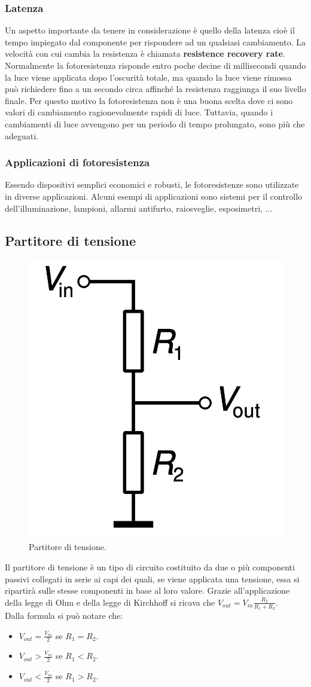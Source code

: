 \documentclass[12pt,oneside,a4paper]{article}
\begin{document}
\subsubsection{Latenza}
Un aspetto importante da tenere in considerazione è quello della latenza cioè il tempo impiegato dal componente per rispondere ad un qualsiasi cambiamento. La velocità con cui cambia la resistenza è chiamata \textbf{resistence recovery rate}.
\\ Normalmente la fotoresistenza risponde entro poche decine di millisecondi quando la luce viene applicata dopo l'oscurità totale, ma quando la luce viene rimossa può richiedere fino a un secondo circa affinché la resistenza raggiunga il suo livello finale. Per questo motivo la fotoresistenza non è una buona scelta dove ci sono valori di cambiamento ragionevolmente rapidi di luce. Tuttavia, quando i cambiamenti di luce avvengono per un periodo di tempo prolungato, sono più che adeguati.


\subsubsection{Applicazioni di fotoresistenza}
Essendo dispositivi semplici economici e robusti, le fotoresistenze sono utilizzate in diverse applicazioni. Alcuni esempi di applicazioni sono sistemi per il controllo dell'illuminazione, lampioni, allarmi antifurto, raiosveglie, esposimetri, ...


\subsection{Partitore di tensione}
\begin{figure}[!htb]
    \centering
    \includegraphics[width=0.3\linewidth]{figures/partitore_tensione.png}
    \caption{Partitore di tensione.}
\end{figure}
Il partitore di tensione\cite{VoltageDivider} è un tipo di circuito costituito da due o più componenti passivi collegati in serie ai capi dei quali, se viene applicata una tensione, essa si ripartirà sulle stesse componenti in base al loro valore.
Grazie all'applicazione della legge di Ohm e della legge di Kirchhoff si ricava che $V_{out} = V_{in} \frac{R_2}{R_1 + R_2}$.
\\Dalla formula si può notare che:
\begin{itemize}
    \item $V_{out} = \frac{V_{in}}{2}$ se $R_1 = R_2$.
    \item $V_{out} > \frac{V_{in}}{2}$ se $R_1 < R_2$.
    \item $V_{out} < \frac{V_{in}}{2}$ se $R_1 > R_2$.
\end{itemize}
\end{document}
